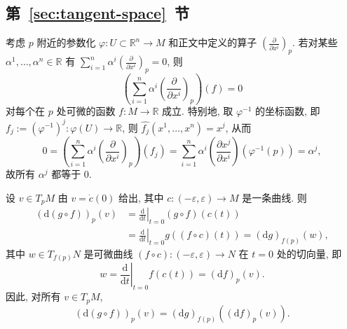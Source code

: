 \subsection{\texorpdfstring{第~\ref{sec:tangent-space}~节}{切空间}}\label{subsec:solutions-tangent-space}

\begin{description}[font=\normalfont,leftmargin=2em,labelwidth=1.5em]
考虑 $p$ 附近的参数化 $\varphi:U\subset\mathbb{R}^n\to M$ 和正文中定义的算子 $\left(\frac{\partial}{\partial x^i}\right)_p$. 若对某些 $\alpha^1,\ldots,\alpha^n\in\mathbb{R}$ 有 $\sum_{i=1}^n\alpha^i\left(\frac{\partial}{\partial x^i}\right)_p=0$, 则
\[
  \left(\sum_{i=1}^n\alpha^i\left(\frac{\partial}{\partial x^i}\right)_p\right)(f)=0
\]
对每个在 $p$ 处可微的函数 $f:M\to\mathbb{R}$ 成立. 特别地, 取 $\varphi^{-1}$ 的坐标函数, 即 $f_j:=(\varphi^{-1})^j:\varphi(U)\to\mathbb{R}$, 则 $\widehat{f_j}(x^1,\ldots,x^n)=x^j$, 从而
\[
  0=\left(\sum_{i=1}^n\alpha^i\left(\frac{\partial}{\partial x^i}\right)_p\right)(f_j)
  =\sum_{i=1}^n\alpha^i\left(\frac{\partial x^j}{\partial x^i}\right)(\varphi^{-1}(p))
  =\alpha^j,
\]
故所有 $\alpha^j$ 都等于 0.

设 $v\in T_pM$ 由 $v=\dot c(0)$ 给出, 其中 $c:(-\varepsilon,\varepsilon)\to M$ 是一条曲线. 则
\begin{align*}
  (\mathrm{d}(g\circ f))_p(v)
  &=\left.\frac{\mathrm{d}}{\mathrm{d}t}\right|_{t=0}(g\circ f)(c(t))\\
  &=\left.\frac{\mathrm{d}}{\mathrm{d}t}\right|_{t=0}g((f\circ c)(t))
  =(\mathrm{d}g)_{f(p)}(w),
\end{align*}
其中 $w\in T_{f(p)}N$ 是可微曲线 $(f\circ c):(-\varepsilon,\varepsilon)\to N$ 在 $t=0$ 处的切向量, 即
\[
  w=\left.\frac{\mathrm{d}}{\mathrm{d}t}\right|_{t=0}f(c(t))=(\mathrm{d}f)_p(v).
\]
因此, 对所有 $v\in T_pM$,
\[
  (\mathrm{d}(g\circ f))_p(v)=(\mathrm{d}g)_{f(p)}((\mathrm{d}f)_p(v)).
\]


\end{description}
